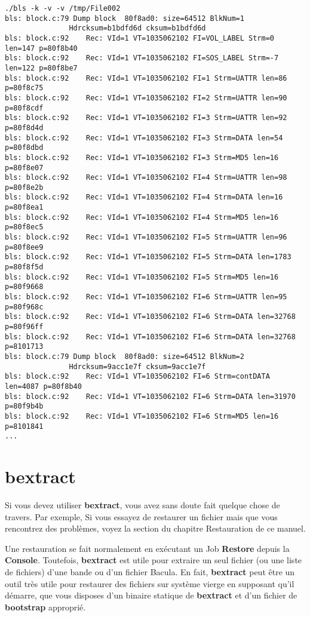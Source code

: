 \footnotesize
\begin{verbatim}
./bls -k -v -v /tmp/File002
bls: block.c:79 Dump block  80f8ad0: size=64512 BlkNum=1
               Hdrcksum=b1bdfd6d cksum=b1bdfd6d
bls: block.c:92    Rec: VId=1 VT=1035062102 FI=VOL_LABEL Strm=0 len=147 p=80f8b40
bls: block.c:92    Rec: VId=1 VT=1035062102 FI=SOS_LABEL Strm=-7 len=122 p=80f8be7
bls: block.c:92    Rec: VId=1 VT=1035062102 FI=1 Strm=UATTR len=86 p=80f8c75
bls: block.c:92    Rec: VId=1 VT=1035062102 FI=2 Strm=UATTR len=90 p=80f8cdf
bls: block.c:92    Rec: VId=1 VT=1035062102 FI=3 Strm=UATTR len=92 p=80f8d4d
bls: block.c:92    Rec: VId=1 VT=1035062102 FI=3 Strm=DATA len=54 p=80f8dbd
bls: block.c:92    Rec: VId=1 VT=1035062102 FI=3 Strm=MD5 len=16 p=80f8e07
bls: block.c:92    Rec: VId=1 VT=1035062102 FI=4 Strm=UATTR len=98 p=80f8e2b
bls: block.c:92    Rec: VId=1 VT=1035062102 FI=4 Strm=DATA len=16 p=80f8ea1
bls: block.c:92    Rec: VId=1 VT=1035062102 FI=4 Strm=MD5 len=16 p=80f8ec5
bls: block.c:92    Rec: VId=1 VT=1035062102 FI=5 Strm=UATTR len=96 p=80f8ee9
bls: block.c:92    Rec: VId=1 VT=1035062102 FI=5 Strm=DATA len=1783 p=80f8f5d
bls: block.c:92    Rec: VId=1 VT=1035062102 FI=5 Strm=MD5 len=16 p=80f9668
bls: block.c:92    Rec: VId=1 VT=1035062102 FI=6 Strm=UATTR len=95 p=80f968c
bls: block.c:92    Rec: VId=1 VT=1035062102 FI=6 Strm=DATA len=32768 p=80f96ff
bls: block.c:92    Rec: VId=1 VT=1035062102 FI=6 Strm=DATA len=32768 p=8101713
bls: block.c:79 Dump block  80f8ad0: size=64512 BlkNum=2
               Hdrcksum=9acc1e7f cksum=9acc1e7f
bls: block.c:92    Rec: VId=1 VT=1035062102 FI=6 Strm=contDATA len=4087 p=80f8b40
bls: block.c:92    Rec: VId=1 VT=1035062102 FI=6 Strm=DATA len=31970 p=80f9b4b
bls: block.c:92    Rec: VId=1 VT=1035062102 FI=6 Strm=MD5 len=16 p=8101841
...
\end{verbatim}
\normalsize

\section{bextract}
\label{bextract}

Si vous devez utiliser {\bf bextract}, vous avez sans doute fait quelque chose
de travers. Par exemple, Si vous essayez de restaurer un fichier mais que vous
rencontrez des problèmes, voyez la section  du chapitre Restauration de ce manuel.

Une restauration se fait normalement en exécutant un Job {\bf Restore}  depuis
la {\bf Console}. Toutefois, {\bf bextract} est utile pour extraire un seul
fichier (ou une liste de fichiers) d'une bande ou d'un fichier Bacula. En fait,
{\bf bextract} peut être un outil très utile pour restaurer des fichiers sur
système vierge en supposant qu'il démarre, que vous disposes d'un binaire
statique de {\bf bextract} et d'un fichier de {\bf bootstrap} approprié. 

